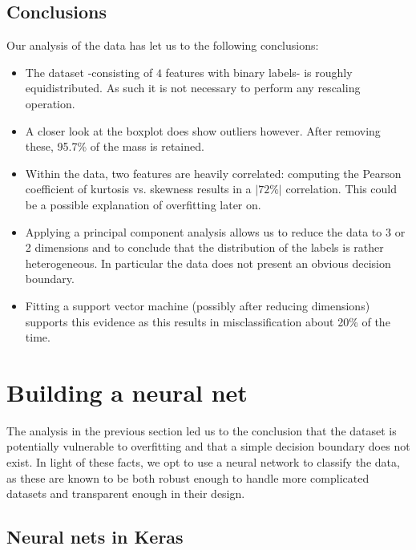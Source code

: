 \documentclass[14pt]{article}
\theoremstyle{plain}
\theoremstyle{definition}
\begin{document}
 \subsection{Conclusions}\label{conc1}
Our analysis of the data has let us to the following conclusions:
\begin{itemize}
\item The dataset -consisting of $4$ features with binary labels-  is roughly equidistributed. As such it is not necessary to perform any rescaling operation.
\item A closer look at the boxplot does show outliers however. After removing these, 95.7\% of the mass is retained.
\item Within the data, two features are heavily correlated: computing the Pearson coefficient of kurtosis vs. skewness results in a $\vert 72\%\vert $ correlation. This could be a possible explanation of overfitting later on.
\item Applying a principal component analysis allows us to reduce the data to 3 or 2 dimensions and to conclude that the distribution of the labels is rather heterogeneous. In particular the data does not present an obvious decision boundary.
\item Fitting a support vector machine (possibly after reducing dimensions) supports this evidence as this results in misclassification about 20\% of the time.
\end{itemize}

\section{Building a neural net}
The analysis in the previous section led us to the conclusion that the dataset is potentially vulnerable to overfitting and that a simple decision boundary does not exist. In light of these facts, we opt to use a neural network to classify the data, as these are known to be both robust enough to handle more complicated datasets and transparent enough in their design.
\subsection{Neural nets in Keras} 
\end{document}
